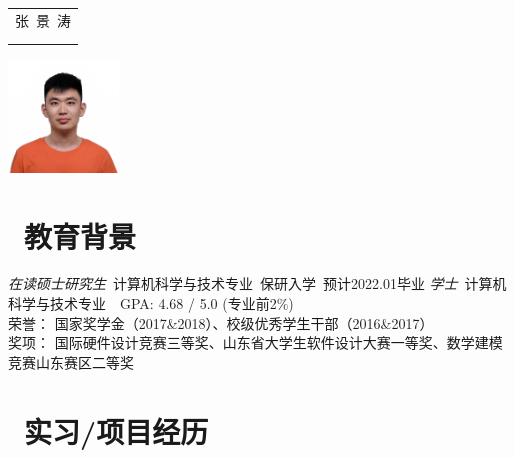\documentclass{resume}
\begin{document}
   
  \begin{minipage}{0.7\textwidth}
    \Large{
      \begin{tabu}  { l }
        \scshape{张\ 景\ 涛} \\
         \\
         \\
      \end{tabu}
    }
  \end{minipage}
  \begin{minipage}{0.3\textwidth}
    \raggedleft
    \includegraphics[height=30mm]{avatar}
  \end{minipage}
  
  \section{\faGraduationCap\ 教育背景}
  \textit{在读硕士研究生}\ 计算机科学与技术专业\ 保研入学\ 预计2022.01毕业
  \textit{学士}\ 计算机科学与技术专业\ \ GPA: 4.68 / 5.0 (专业前2\%) \\
  荣誉： 国家奖学金（2017\&2018）、校级优秀学生干部（2016\&2017） \\
  奖项： 国际硬件设计竞赛三等奖、山东省大学生软件设计大赛一等奖、数学建模竞赛山东赛区二等奖
  
  \section{\faUsers\ 实习/项目经历}
  
\end{document}
